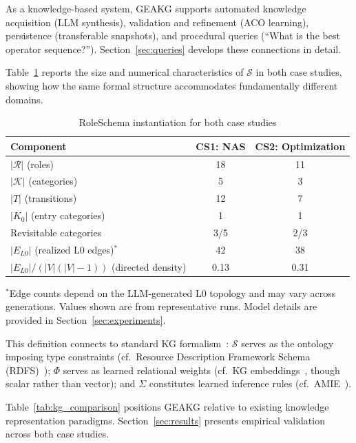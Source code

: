 As a knowledge-based system, GEAKG supports automated knowledge acquisition (LLM synthesis), validation and refinement (ACO learning), persistence (transferable snapshots), and procedural queries (``What is the best operator sequence?''). Section~\ref{sec:queries} develops these connections in detail.

Table~\ref{tab:roleschema_instances} reports the size and numerical characteristics of $\mathcal{S}$ in both case studies, showing how the same formal structure accommodates fundamentally different domains.

\begin{table}[!htbp]
\centering
\caption{RoleSchema instantiation for both case studies}
\label{tab:roleschema_instances}
\begin{tabular}{@{}lcc@{}}
\toprule
\textbf{Component} & \textbf{CS1: NAS} & \textbf{CS2: Optimization} \\
\midrule
$|\mathcal{R}|$ (roles) & 18 & 11 \\
$|\mathcal{K}|$ (categories) & 5 & 3 \\
$|T|$ (transitions) & 12 & 7 \\
$|K_0|$ (entry categories) & 1 & 1 \\
Revisitable categories & 3/5 & 2/3 \\
$|E_{L0}|$ (realized L0 edges)$^*$ & 42 & 38 \\
$|E_{L0}|/(|V|(|V|-1))$ (directed density) & 0.13 & 0.31 \\
\bottomrule
\end{tabular}
\vspace{2pt}

{\scriptsize $^*$Edge counts depend on the LLM-generated L0 topology and may vary across generations. Values shown are from representative runs. Model details are provided in Section~\ref{sec:experiments}.}
\end{table}

This definition connects to standard KG formalism~\cite{hogan2021knowledge}: $\mathcal{S}$ serves as the ontology imposing type constraints (cf.\ Resource Description Framework Schema (RDFS)~\cite{noy2001ontology}); $\Phi$ serves as learned relational weights (cf.\ KG embeddings~\cite{bordes2013translating}, though scalar rather than vector); and $\Sigma$ constitutes learned inference rules (cf.\ AMIE~\cite{galarraga2013amie}).

Table~\ref{tab:kg_comparison} positions GEAKG relative to existing knowledge representation paradigms. Section~\ref{sec:results} presents empirical validation across both case studies.

